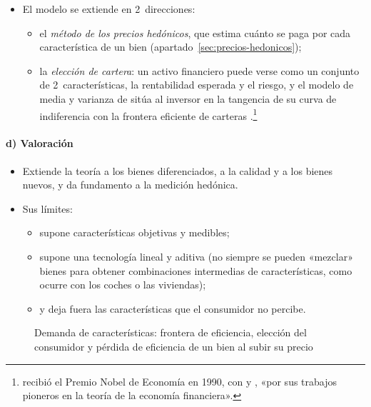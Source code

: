 \documentclass[11pt]{article}
\begin{document}
\begin{itemize}
\item El modelo se extiende en 2~direcciones:
\begin{itemize}
\item el \emph{método de los precios hedónicos}, que estima cuánto se paga por cada característica de un bien (apartado~\ref{sec:precios-hedonicos});
\item la \emph{elección de cartera}: un activo financiero puede verse como un conjunto de 2~características, la rentabilidad esperada y el riesgo, y el modelo de media y varianza de \textcite{Markowitz1952Portfolio} sitúa al inversor en la tangencia de su curva de indiferencia con la frontera eficiente de carteras  .\footnote{ recibió el Premio Nobel de Economía en 1990, con  y , «por sus trabajos pioneros en la teoría de la economía financiera»\nocite{Nobel1990Markowitz}.}
\end{itemize}
\end{itemize}

\paragraph{d) Valoración}

\begin{itemize}
\item Extiende la teoría a los bienes diferenciados, a la calidad y a los bienes nuevos, y da fundamento a la medición hedónica.
\item Sus límites\nocite{Lancaster1966New}:
  \begin{itemize}
  \item supone características objetivas y medibles;
  \item supone una tecnología lineal y aditiva (no siempre se pueden «mezclar» bienes para obtener combinaciones intermedias de características, como ocurre con los coches o las viviendas);
  \item y deja fuera las características que el consumidor no percibe.
  \end{itemize}
\end{itemize}

\begin{figure}[H]
\centering
\caption{Demanda de características: frontera de eficiencia, elección del consumidor y pérdida de eficiencia de un bien al subir su precio}\label{fig:lancaster-caracteristicas}
\end{figure}
\end{document}
